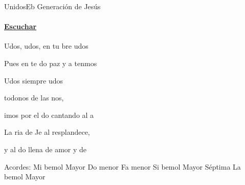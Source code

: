 \documentclass[12pt, spanish]{book}
\newcommand{\NotCCLIed}{\relax}
\begin{document}
    \begin{song}{Unidos}{Eb}
        {} %
        {Generación de Jesús}
        {} %
        {} %
        \ifChordBk
        \paragraph{\mbox{}\hfill\protect\href{https://open.spotify.com/intl-es/track/7pqtm8Bpuvgn5cYOHTvmru}{Escuchar}\mbox{}\hfill}
        \fi

        \begin{SBOpGroup}
            Udos, udos, en tu bre udos
        \end{SBOpGroup}

        \begin{SBOpGroup}
            Pues en te do paz y a tenmos
        \end{SBOpGroup}

        \begin{SBChorus}
            Udos siempre udos

            todonos de las nos,

            imos por el do cantando al a
        \end{SBChorus}

        \begin{SBOpGroup}
            La ria de Je al  resplandece,

            y al do llena de amor y de ~~
        \end{SBOpGroup}


        \ifChordBk
        \begin{SBOpGroup}
            Acordes:
            \upchord{\Eflat}\qquad Mi bemol Mayor \hfill
            \upchord{\Cm}Do menor \hfill\null\break
            \upchord{\Fm}\quad Fa menor \hfill
            \upchord{\Bflatseven}\quad Si bemol Mayor S\'eptima \hfill\null\break
            \upchord{\Aflat}\qquad La bemol Mayor \hfill
        \end{SBOpGroup}
        \fi
        \begin{SBExtraKeys}{

}
\end{SBExtraKeys}
\end{song}
\end{document}
